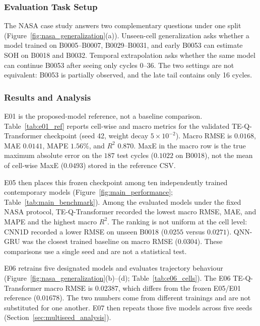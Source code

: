 \documentclass[a4paper,fleqn]{cas-sc}
\begin{document}
\subsubsection{Evaluation Task Setup}
\label{sec:nasa_task_setup}

The NASA case study answers two complementary questions under one split (Figure~\ref{fig:nasa_generalization}(a)). Unseen-cell generalization asks whether a model trained on B0005--B0007, B0029--B0031, and early B0053 can estimate SOH on B0018 and B0032. Temporal extrapolation asks whether the same model can continue B0053 after seeing only cycles 0--36. The two settings are not equivalent: B0053 is partially observed, and the late tail contains only 16 cycles.

\subsubsection{Results and Analysis}
\label{sec:nasa_results}

E01 is the proposed-model reference, not a baseline comparison. Table~\ref{tab:e01_ref} reports cell-wise and macro metrics for the validated TE-Q-Transformer checkpoint (seed 42, weight decay $5\times10^{-2}$). Macro RMSE is $0.0168$, MAE $0.0141$, MAPE $1.56\%$, and $R^2$ $0.870$. MaxE in the macro row is the true maximum absolute error on the $187$ test cycles ($0.1022$ on B0018), not the mean of cell-wise MaxE ($0.0493$) stored in the reference CSV.

E05 then places this frozen checkpoint among ten independently trained contemporary models (Figure~\ref{fig:main_performance}; Table~\ref{tab:main_benchmark}). Among the evaluated models under the fixed NASA protocol, TE-Q-Transformer recorded the lowest macro RMSE, MAE, and MAPE and the highest macro $R^2$. The ranking is not uniform at the cell level: CNN1D recorded a lower RMSE on unseen B0018 ($0.0255$ versus $0.0271$). QNN-GRU was the closest trained baseline on macro RMSE ($0.0304$). These comparisons use a single seed and are not a statistical test.

E06 retrains five designated models and evaluates trajectory behaviour (Figure~\ref{fig:nasa_generalization}(b)--(d); Table~\ref{tab:e06_cells}). The E06 TE-Q-Transformer macro RMSE is $0.02387$, which differs from the frozen E05/E01 reference ($0.01678$). The two numbers come from different trainings and are not substituted for one another. E07 then repeats those five models across five seeds (Section~\ref{sec:multiseed_analysis}).
\end{document}

